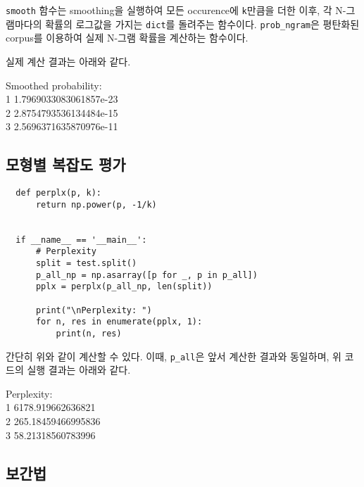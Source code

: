 \documentclass[a4paper,11pt]{scrartcl}
\begin{document}
\lstinline{smooth} 함수는 smoothing을 실행하여 모든 occurence에 \lstinline{k}만큼을 더한 이후, 각 N-그램마다의 확률의 로그값을 가지는 \lstinline{dict}를 돌려주는 함수이다. \lstinline{prob_ngram}은 평탄화된 corpus를 이용하여 실제 N-그램 확률을 계산하는 함수이다.

실제 계산 결과는 아래와 같다.

\par\medskip
\begin{longfbox}[margin-left=1em]
  \ttfamily
  \noindent Smoothed probability: \\
  1 1.7969033083061857e-23 \\
  2 2.8754793536134484e-15 \\
  3 2.5696371635870976e-11
\end{longfbox}

\subsection{모형별 복잡도 평가}
\begin{lstlisting}
  def perplx(p, k):
      return np.power(p, -1/k)


  if __name__ == '__main__':
      # Perplexity
      split = test.split()
      p_all_np = np.asarray([p for _, p in p_all])
      pplx = perplx(p_all_np, len(split))

      print("\nPerplexity: ")
      for n, res in enumerate(pplx, 1):
          print(n, res)
\end{lstlisting}

간단히 위와 같이 계산할 수 있다. 이때, \lstinline{p_all}은 앞서 계산한 결과와 동일하며, 위 코드의 실행 결과는 아래와 같다.

\par\medskip
\begin{longfbox}[margin-left=1em]
  \ttfamily
  \noindent Perplexity: \\
  1 6178.919662636821 \\
  2 265.18459466995836 \\
  3 58.21318560783996
\end{longfbox}

\subsection{보간법}
\end{document}
